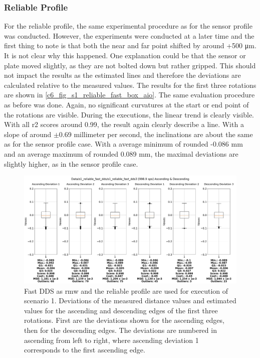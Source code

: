 \subsubsection{Reliable Profile}
For the reliable profile, the same experimental procedure as for the sensor profile was conducted. However, the experiments were conducted at a later time and the first thing to note is that both the near and far point shifted by around +500 \si{\micro\meter}. It is not clear why this happened. One explanation could be that the sensor or plate moved slightly, as they are not bolted down but rather gripped. This should not impact the results as the estimated lines and therefore the deviations are calculated relative to the measured values.\newline 
The results for the first three rotations are shown in \autoref{c6_fig_s1_reliable_fast_box_aio}. The same evaluation procedure as before was done. Again, no significant curvatures at the start or end point of the rotations are visible. During the executions, the linear trend is clearly visible. With all \gls{r2} scores around 0.99, the result again clearly describe a line. With a slope of around $\pm$0.69 millimeter per second, the inclinations are about the same as for the sensor profile case. With a average minimum of rounded -0.086 \si{\milli\meter} and an average maximum of rounded 0.089 \si{\milli\meter}, the maximal deviations are slightly higher, as in the sensor profile case. 
\begin{figure}[H]
	\centering
	\includegraphics[width=1\textwidth]{Figures/c6/s1/s1_reliable_fast_dds_3_box_aio.pdf}
	\caption{Fast DDS as \gls{rmw} and the reliable profile are used for execution of scenario 1. Deviations of the measured distance values and estimated values for the ascending and descending edges of the first three rotations. First are the deviations shown for the ascending edges, then for the descending edges. The deviations are numbered in ascending from left to right, where ascending deviation 1 corresponds to the first ascending edge.}
	\label{c6_fig_s1_reliable_fast_box_aio}
\end{figure}
